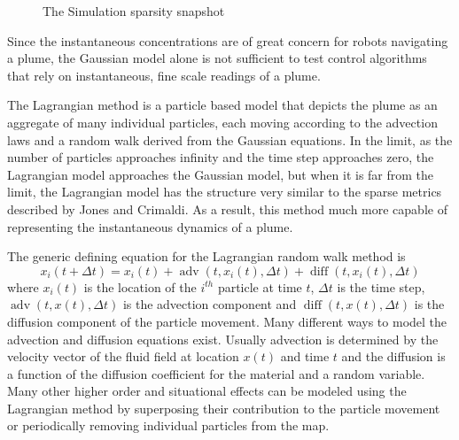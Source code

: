 \documentclass[ letterpaper, 10 pt, conference]{ieeeconf}  %
\DeclareMathOperator{\diff}{diff}
\DeclareMathOperator{\adv}{adv}
\begin{document}
\begin{figure}[thpb]
      \centering	
      \caption{The Simulation sparsity snapshot}
      \label{pic:simSpont}
 \end{figure}

Since the instantaneous concentrations are of great concern for robots navigating a plume,  the Gaussian model alone is not sufficient to test control algorithms that rely on instantaneous, fine scale readings of a plume.    


The Lagrangian method is a particle based model that depicts the plume as  an aggregate of many individual particles, each moving according to the advection laws and a random walk derived from the Gaussian equations.   In the limit, as the number of particles approaches infinity and the time step approaches zero, the Lagrangian model approaches the Gaussian model, but when it is far from the limit, the Lagrangian model has the structure very similar to the sparse metrics described by Jones and Crimaldi.  As a result, this method  much more capable of representing the instantaneous dynamics of a plume.



The generic defining equation for the Lagrangian random walk method is
	\begin{equation}\label{eq:Lagrange}
	x_i(t+ \Delta t) =x_i(t) +  \adv{(t, x_i(t),  \Delta t )} + \diff{(t, x_i(t), \Delta t)}  
	\end{equation}
where $x_i(t)$ is the location of the $i^{th}$ particle at time $t$, $\Delta t$ is the time step, $\adv{(t,x(t), \Delta t)}$ is the advection component and $\diff{(t, x(t), \Delta t)}$ is the diffusion component of the particle movement.  Many different ways to model the advection and diffusion equations exist. Usually advection is determined by the velocity vector of the fluid field at location $x(t)$ and time $t$ and the diffusion is a function of the diffusion coefficient for the material and a random variable.    Many other higher order and situational effects can be modeled using the Lagrangian method by superposing their contribution to the particle movement or periodically removing individual particles from the map. 
\end{document}
